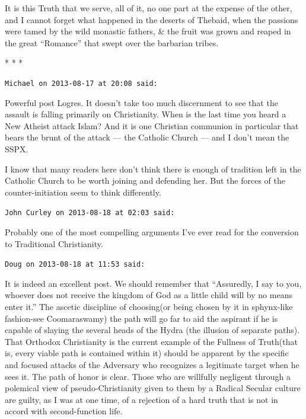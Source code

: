 It is this Truth that we serve, all of it, no one part at the expense of the other, and I cannot forget what happened in the deserts of Thebaid, when the passions were tamed by the wild monastic fathers, \& the fruit was grown and reaped in the great ``Romance'' that swept over the barbarian tribes.



\begin{center}* * *\end{center}

\begin{footnotesize}
\begin{sffamily}
\texttt{Michael on 2013-08-17 at 20:08 said:}

Powerful post Logres. It doesn't take too much discernment to see that the assault is falling primarily on Christianity. When is the last time you heard a New Atheist attack Islam? And it is one Christian communion in particular that bears the brunt of the attack --- the Catholic Church --- and I don't mean the SSPX.

I know that many readers here don't think there is enough of tradition left in the Catholic Church to be worth joining and defending her. But the forces of the counter-initiation seem to think differently.

\hfill

\texttt{John Curley on 2013-08-18 at 02:03 said:}

Probably one of the most compelling arguments I've ever read for the conversion to Traditional Christianity.

\hfill

\texttt{Doug on 2013-08-18 at 11:53 said:}

It is indeed an excellent post. We should remember that ``Assuredly, I say to you, whoever does not receive the kingdom of God as a little child will by no means enter it.'' The ascetic discipline of choosing(or being chosen by it in sphynx-like fashion-see Coomaraswamy) the path will go far to aid the aspirant if he is capable of slaying the several heads of the Hydra (the illusion of separate paths). That Orthodox Christianity is the current example of the Fullness of Truth(that is, every viable path is contained within it) should be apparent by the specific and focused attacks of the Adversary who recognizes a legitimate target when he sees it. The path of honor is clear. Those who are willfully negligent through a polemical view of pseudo-Christianity given to them by a Radical Secular culture are guilty, as I was at one time, of a rejection of a hard truth that is not in accord with second-function life.


\end{sffamily}
\end{footnotesize}
